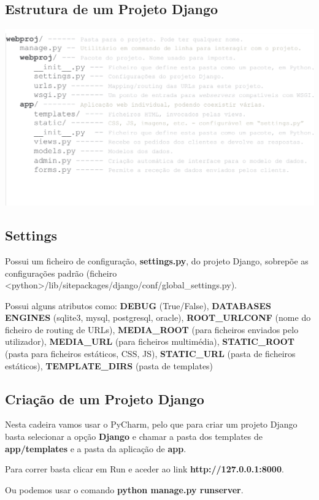 \documentclass{article}
\begin{document}
\subsection{Estrutura de um Projeto Django}

\begin{center}
  \includegraphics[scale=0.3]{9}
\end{center}

\pagebreak

\subsection{Settings}

\begin{flushleft}
  Possui um ficheiro de configuração, \textbf{settings.py},
  do projeto Django, sobrepõe as configurações padrão
  (ficheiro <python>/lib/sitepackages/django/conf/global\_settings.py).

  \vspace{2mm}
  Possui alguns atributos como: \textbf{DEBUG} (True/False),
  \textbf{DATABASES ENGINES} (sqlite3, mysql, postgresql, oracle),
  \textbf{ROOT\_URLCONF} (nome do ficheiro de routing de URLs),
  \textbf{MEDIA\_ROOT} (para ficheiros enviados pelo utilizador),
  \textbf{MEDIA\_URL} (para ficheiros multimédia),
  \textbf{STATIC\_ROOT} (pasta para ficheiros estáticos, CSS, JS),
  \textbf{STATIC\_URL} (pasta de ficheiros estáticos),
  \textbf{TEMPLATE\_DIRS} (pasta de templates)
\end{flushleft}

\subsection{Criação de um Projeto Django}

\begin{flushleft}
  Nesta cadeira vamos usar o PyCharm, pelo que para criar um projeto Django
  basta selecionar a opção \textbf{Django} e chamar a pasta dos templates de
  \textbf{app/templates} e a pasta da aplicação de \textbf{app}.
  
  Para correr basta clicar em Run e aceder ao link \textbf{http://127.0.0.1:8000}.

  Ou podemos usar o comando \textbf{python manage.py runserver}.
\end{flushleft}
\end{document}

